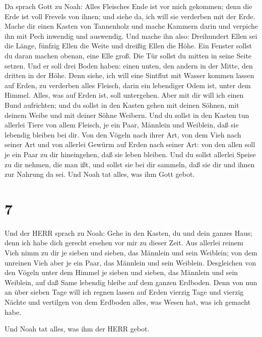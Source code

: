  Da sprach Gott zu Noah: Alles Fleisches Ende ist vor mich
gekommen; denn die Erde ist voll Frevels von ihnen; und siehe da, ich
will sie verderben mit der Erde.  Mache dir einen Kasten
von Tannenholz und mache Kammern darin und verpiche ihn mit Pech
inwendig und auswendig.  Und mache ihn also: Dreihundert
Ellen sei die Länge, fünfzig Ellen die Weite und dreißig Ellen die Höhe.
 Ein Fenster sollst du daran machen obenan, eine Elle groß.
Die Tür sollst du mitten in seine Seite setzen. Und er soll drei Boden
haben: einen unten, den andern in der Mitte, den dritten in der Höhe.
 Denn siehe, ich will eine Sintflut mit Wasser kommen
lassen auf Erden, zu verderben alles Fleisch, darin ein lebendiger Odem
ist, unter dem Himmel. Alles, was auf Erden ist, soll untergehen.
 Aber mit dir will ich einen Bund aufrichten; und du sollst
in den Kasten gehen mit deinen Söhnen, mit deinem Weibe und mit deiner
Söhne Weibern.  Und du sollst in den Kasten tun allerlei
Tiere von allem Fleisch, je ein Paar, Männlein und Weiblein, daß sie
lebendig bleiben bei dir.  Von den Vögeln nach ihrer Art,
von dem Vieh nach seiner Art und von allerlei Gewürm auf Erden nach
seiner Art: von den allen soll je ein Paar zu dir hineingehen, daß sie
leben bleiben.  Und du sollst allerlei Speise zu dir
nehmen, die man ißt, und sollst sie bei dir sammeln, daß sie dir und
ihnen zur Nahrung da sei.  Und Noah tat alles, was ihm Gott
gebot.

\hypertarget{section-6}{%
\section{7}\label{section-6}}

 Und der HERR sprach zu Noah: Gehe in den Kasten, du und
dein ganzes Haus; denn ich habe dich gerecht ersehen vor mir zu dieser
Zeit.  Aus allerlei reinem Vieh nimm zu dir je sieben und
sieben, das Männlein und sein Weiblein; von dem unreinen Vieh aber je
ein Paar, das Männlein und sein Weiblein.  Desgleichen von
den Vögeln unter dem Himmel je sieben und sieben, das Männlein und sein
Weiblein, auf daß Same lebendig bleibe auf dem ganzen Erdboden.
 Denn von nun an über sieben Tage will ich regnen lassen auf
Erden vierzig Tage und vierzig Nächte und vertilgen von dem Erdboden
alles, was Wesen hat, was ich gemacht habe.

 Und Noah tat alles, was ihm der HERR gebot.

